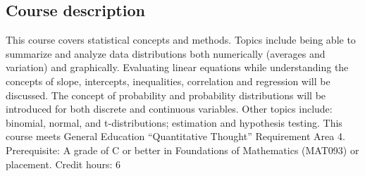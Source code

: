 \documentclass[12pt,letterpaper]{article}
\begin{document}
\subsection*{Course description}
This course covers statistical concepts and methods.  Topics include being able to summarize and analyze data distributions both numerically (averages and variation) and graphically.  Evaluating linear equations while understanding the concepts of slope, intercepts, inequalities, correlation and regression will be discussed.  The concept of probability and probability distributions will be introduced for both discrete and continuous variables.  Other topics include:  binomial, normal, and t-distributions; estimation and hypothesis testing.  This course meets General Education “Quantitative Thought” Requirement Area 4.
Prerequisite: A grade of C or better in Foundations of Mathematics (MAT093) or placement. Credit hours: 6
\end{document}
